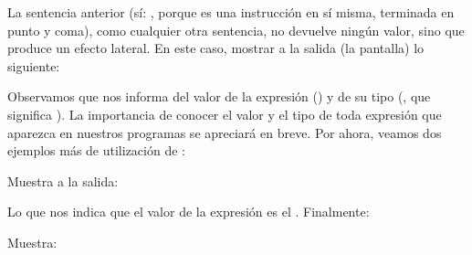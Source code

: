 \documentclass[a4paper,12pt,spanish]{sphinxmanual}
\begin{document}
La sentencia anterior (sí: , porque es una instrucción en sí misma,
terminada en punto y coma), como cualquier otra sentencia, no devuelve ningún
valor, sino que produce un efecto lateral. En este caso, mostrar a la salida
(la pantalla) lo siguiente:

\begin{sphinxVerbatim}[commandchars=\\\{\}]
\end{sphinxVerbatim}

\ignorespaces 
Observamos que  nos informa del valor de la expresión () y de
su tipo (, que significa ). La importancia de conocer
el valor y el tipo de toda expresión que aparezca en nuestros programas se
apreciará en breve. Por ahora, veamos dos ejemplos más de utilización de
:

\begin{sphinxVerbatim}[commandchars=\\\{\}]
  
\end{sphinxVerbatim}

Muestra a la salida:

\begin{sphinxVerbatim}[commandchars=\\\{\}]
\end{sphinxVerbatim}

\ignorespaces 
Lo que nos indica que el valor de la expresión  es el  . Finalmente:

\begin{sphinxVerbatim}[commandchars=\\\{\}]
\end{sphinxVerbatim}

Muestra:

\begin{sphinxVerbatim}[commandchars=\\\{\}]
 
\end{sphinxVerbatim}
\end{document}
